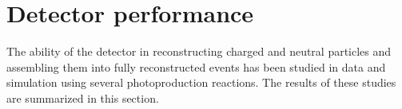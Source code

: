 
\section[Detector performance]{Detector performance \label{sec:performance}}

The ability of the \gx{} detector in reconstructing charged and neutral particles and assembling them into fully reconstructed events has been studied in data and simulation using several photoproduction reactions.  The results of these studies are summarized in this section.




